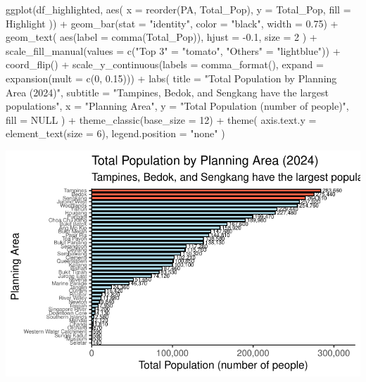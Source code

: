 \documentclass[
  letterpaper,
  DIV=11,
  numbers=noendperiod]{scrartcl}
\newenvironment{Shaded}{\begin{snugshade}}{\end{snugshade}}
\newcommand{\AttributeTok}[1]{\textcolor[rgb]{0.40,0.45,0.13}{#1}}
\newcommand{\ConstantTok}[1]{\textcolor[rgb]{0.56,0.35,0.01}{#1}}
\newcommand{\DecValTok}[1]{\textcolor[rgb]{0.68,0.00,0.00}{#1}}
\newcommand{\FloatTok}[1]{\textcolor[rgb]{0.68,0.00,0.00}{#1}}
\newcommand{\FunctionTok}[1]{\textcolor[rgb]{0.28,0.35,0.67}{#1}}
\newcommand{\NormalTok}[1]{\textcolor[rgb]{0.00,0.23,0.31}{#1}}
\newcommand{\OtherTok}[1]{\textcolor[rgb]{0.00,0.23,0.31}{#1}}
\newcommand{\SpecialCharTok}[1]{\textcolor[rgb]{0.37,0.37,0.37}{#1}}
\newcommand{\StringTok}[1]{\textcolor[rgb]{0.13,0.47,0.30}{#1}}
\begin{document}
\begin{Shaded}
\begin{Highlighting}[]
\FunctionTok{ggplot}\NormalTok{(df\_highlighted, }\FunctionTok{aes}\NormalTok{(}
    \AttributeTok{x =} \FunctionTok{reorder}\NormalTok{(PA, Total\_Pop),}
    \AttributeTok{y =}\NormalTok{ Total\_Pop,}
    \AttributeTok{fill =}\NormalTok{ Highlight}
\NormalTok{  )) }\SpecialCharTok{+}
  \FunctionTok{geom\_bar}\NormalTok{(}\AttributeTok{stat =} \StringTok{"identity"}\NormalTok{, }\AttributeTok{color =} \StringTok{"black"}\NormalTok{, }\AttributeTok{width =} \FloatTok{0.75}\NormalTok{) }\SpecialCharTok{+}
  \FunctionTok{geom\_text}\NormalTok{(  }
    \FunctionTok{aes}\NormalTok{(}\AttributeTok{label =} \FunctionTok{comma}\NormalTok{(Total\_Pop)),}
    \AttributeTok{hjust =} \SpecialCharTok{{-}}\FloatTok{0.1}\NormalTok{,}
    \AttributeTok{size =} \DecValTok{2}
\NormalTok{  ) }\SpecialCharTok{+}
  \FunctionTok{scale\_fill\_manual}\NormalTok{(}\AttributeTok{values =} \FunctionTok{c}\NormalTok{(}\StringTok{"Top 3"} \OtherTok{=} \StringTok{"tomato"}\NormalTok{, }\StringTok{"Others"} \OtherTok{=} \StringTok{"lightblue"}\NormalTok{)) }\SpecialCharTok{+}
  \FunctionTok{coord\_flip}\NormalTok{() }\SpecialCharTok{+}
  \FunctionTok{scale\_y\_continuous}\NormalTok{(}\AttributeTok{labels =} \FunctionTok{comma\_format}\NormalTok{(), }\AttributeTok{expand =} \FunctionTok{expansion}\NormalTok{(}\AttributeTok{mult =} \FunctionTok{c}\NormalTok{(}\DecValTok{0}\NormalTok{, }\FloatTok{0.15}\NormalTok{))) }\SpecialCharTok{+}
  \FunctionTok{labs}\NormalTok{(}
    \AttributeTok{title =} \StringTok{"Total Population by Planning Area (2024)"}\NormalTok{,}
    \AttributeTok{subtitle =} \StringTok{"Tampines, Bedok, and Sengkang have the largest populations"}\NormalTok{,}
    \AttributeTok{x =} \StringTok{"Planning Area"}\NormalTok{,}
    \AttributeTok{y =} \StringTok{"Total Population (number of people)"}\NormalTok{,}
    \AttributeTok{fill =} \ConstantTok{NULL}
\NormalTok{  ) }\SpecialCharTok{+}
  \FunctionTok{theme\_classic}\NormalTok{(}\AttributeTok{base\_size =} \DecValTok{12}\NormalTok{) }\SpecialCharTok{+}
  \FunctionTok{theme}\NormalTok{(}
    \AttributeTok{axis.text.y =} \FunctionTok{element\_text}\NormalTok{(}\AttributeTok{size =} \DecValTok{6}\NormalTok{),}
    \AttributeTok{legend.position =} \StringTok{"none"}
\NormalTok{  )}
\end{Highlighting}
\end{Shaded}

\includegraphics{Take-home_Ex01_files/figure-pdf/unnamed-chunk-22-1.pdf}
\end{document}
